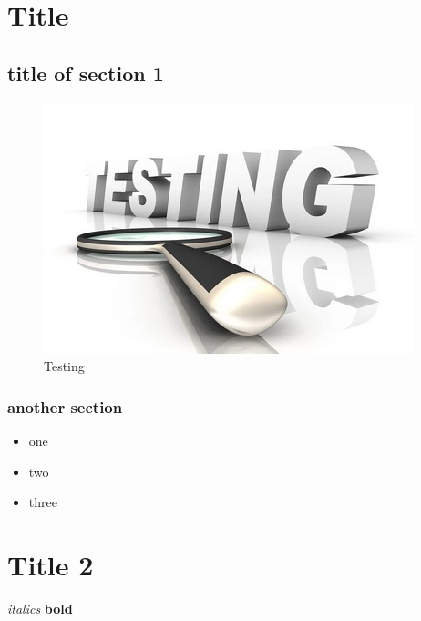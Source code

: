 \documentclass[11pt]{article} %
\begin{document}
\begin{multicols}{2} %
\setcounter{page}{1} %

\section{Title}
\lipsum[2] %
    \subsection{title of section 1}
    \lipsum[2-3] %

    \begin{figure}[h] %
        \centering
        \includegraphics[scale=0.7]{test_figure.jpg} %
        \caption{Testing}
    \end{figure}
            \subsubsection{another section}
            \lipsum[2-3] %
\begin{itemize}
    \item one
    \item two
    \item three
\end{itemize}

\section{Title 2}
\lipsum[2-3] %
\textit{italics}
\textbf{bold}
\\


\end{multicols}
\end{document}
